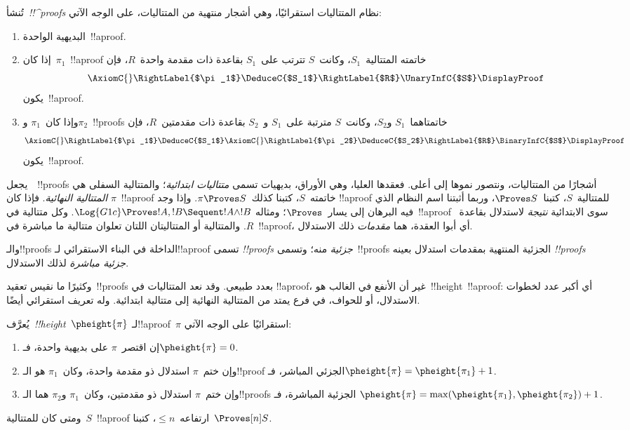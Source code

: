 \documentclass[../../../include/open-logic-section]{subfiles}
\begin{document}
\begin{defn}
تُنشأ~\emph{!!^{proof}s} نظام المتتاليات استقرائيًا، وهي أشجار منتهية من
المتتاليات، على الوجه الآتي:
\begin{enumerate}
  \item{} البديهية الواحدة~!!a{proof}.
  \item{} إذا كان~$\pi_1$~!!a{proof} خاتمته
  المتتالية~$S_1$، وكانت~$S$ تترتب على~$S_1$ بقاعدة ذات مقدمة واحدة~$R$، فإن
  \[
  \AxiomC{}
  \RightLabel{$\pi_1$}
  \DeduceC{$S_1$}
  \RightLabel{$R$}
  \UnaryInfC{$S$}
  \DisplayProof
  \]
  يكون~!!a{proof}.
  \item{} وإذا كان~$\pi_1$ و$\pi_2$~!!{proof}s
  خاتمتاهما~$S_1$ و$S_2$، وكانت~$S$ مترتبة على~$S_1$
  و~$S_2$ بقاعدة ذات مقدمتين~$R$، فإن
  \[
  \AxiomC{}
  \RightLabel{$\pi_1$}
  \DeduceC{$S_1$}
  \AxiomC{}
  \RightLabel{$\pi_2$}
  \DeduceC{$S_2$}
  \RightLabel{$R$}
  \BinaryInfC{$S$}
  \DisplayProof
  \]
  يكون~!!a{proof}.
\end{enumerate}
\end{defn}

يجعل~~!!{proof}s أشجارًا من المتتاليات، ونتصور نموها
إلى أعلى. فعقدها العليا، وهي الأوراق، بديهيات تسمى \emph{متتاليات
ابتدائية}؛ والمتتالية السفلى هي \emph{المتتالية النهائية}. فإذا كان
$\pi$~!!a{proof} خاتمته~$S$، كتبنا كذلك~$\pi\Proves S$. وإذا وجد
!!a{proof} للمتتالية~$S$، كتبنا~$\Proves S$، وربما أثبتنا اسم النظام
الذي فيه البرهان إلى يسار~$\Proves$؛ ومثاله
$\Log{G1c}\Proves !A,!B\Sequent !A\land !B$. وكل متتالية في~!!a{proof}
سوى الابتدائية \emph{نتيجة} لاستدلال بقاعدة~$R$. والمتتالية أو
المتتاليتان اللتان تعلوان متتالية ما مباشرة في~!!a{proof}، أي أبوا
العقدة، هما \emph{مقدمات} ذلك الاستدلال.

والـ!!{proof}s الداخلة في البناء الاستقرائي لـ!!a{proof} تسمى
\emph{!!{proof}s جزئية} منه؛ وتسمى~!!{proof}s الجزئية المنتهية بمقدمات استدلال بعينه
\emph{!!{proof}s جزئية مباشرة} لذلك الاستدلال.

وكثيرًا ما نقيس تعقيد~!!{proof}s بعدد طبيعي. وقد نعد المتتاليات في
!!a{proof}، غير أن الأنفع في الغالب هو~!!{height}~!!a{proof}: أي أكبر
عدد لخطوات الاستدلال، أو للحواف، في فرع يمتد من المتتالية النهائية إلى
متتالية ابتدائية. وله تعريف استقرائي أيضًا.

\begin{defn}
يُعرَّف~\emph{!!{height}}~$\pheight{\pi}$ لـ!!a{proof}~$\pi$ استقرائيًا
على الوجه الآتي:
\begin{enumerate}
  \item إن اقتصر~$\pi$ على بديهية واحدة، فـ$\pheight{\pi}=0$.
  \item وإن ختم~$\pi$ استدلال ذو مقدمة واحدة، وكان~$\pi_1$ هو
  الـ!!{proof} الجزئي المباشر، فـ$\pheight{\pi}=\pheight{\pi_1}+1$.
  \item وإن ختم~$\pi$ استدلال ذو مقدمتين، وكان~$\pi_1$ و$\pi_2$
  هما الـ!!{proof}s الجزئية المباشرة، فـ
  $\pheight{\pi}=\max(\pheight{\pi_1},\pheight{\pi_2})+1$.
\end{enumerate}
ومتى كان للمتتالية~$S$~!!a{proof} ارتفاعه~$\le n$، كتبنا~$\Proves[n]S$.
\end{defn}
\end{document}
